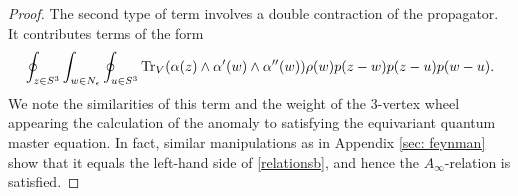 \begin{proof}
The second type of term involves a double contraction of the propagator. 
It contributes terms of the form
\[
\oint_{z \in S^3} \int_{w \in N_\epsilon} \oint_{u \in S^3} {\rm Tr}_V(\alpha(z) \wedge \alpha'(w) \wedge \alpha''(w)) \rho(w) p(z-w) p(z-u) p(w-u) .
\]
We note the similarities of this term and the weight of the $3$-vertex wheel appearing the calculation of the anomaly to satisfying the equivariant quantum master equation. 
In fact, similar manipulations as in Appendix \ref{sec: feynman} show that it equals the left-hand side of \ref{relationsb}, and hence the $A_\infty$-relation is satisfied.
%
\end{proof}


